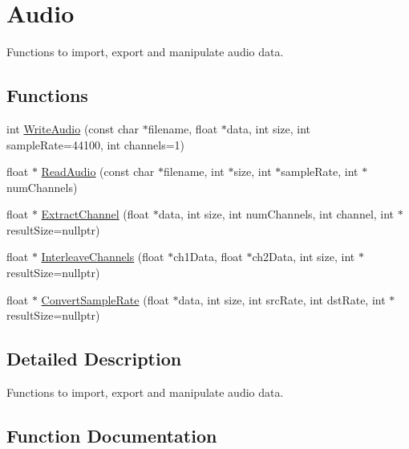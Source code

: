 \hypertarget{group__audio__group}{}\section{Audio}
\label{group__audio__group}


Functions to import, export and manipulate audio data.  


\subsection*{Functions}
\begin{DoxyCompactItemize}
\item 
int \hyperlink{group__audio__group_gaf55add952fe04c4b2758d18db17c8c91}{Write\+Audio} (const char $\ast$filename, float $\ast$data, int size, int sample\+Rate=44100, int channels=1)
\item 
float $\ast$ \hyperlink{group__audio__group_gac361b2470f0258861b9e34deffc8852a}{Read\+Audio} (const char $\ast$filename, int $\ast$size, int $\ast$sample\+Rate, int $\ast$num\+Channels)
\item 
float $\ast$ \hyperlink{group__audio__group_gabf6e39c7686cd89ddc45a0b6be943279}{Extract\+Channel} (float $\ast$data, int size, int num\+Channels, int channel, int $\ast$result\+Size=nullptr)
\item 
float $\ast$ \hyperlink{group__audio__group_ga701f2f439ffe751ed1a5f0b26d23e1c4}{Interleave\+Channels} (float $\ast$ch1\+Data, float $\ast$ch2\+Data, int size, int $\ast$result\+Size=nullptr)
\item 
float $\ast$ \hyperlink{group__audio__group_ga1f60f80cc1589adf04e9b253a5b872b8}{Convert\+Sample\+Rate} (float $\ast$data, int size, int src\+Rate, int dst\+Rate, int $\ast$result\+Size=nullptr)
\end{DoxyCompactItemize}


\subsection{Detailed Description}
Functions to import, export and manipulate audio data. 



\subsection{Function Documentation}
\mbox{\label{group__audio__group_ga1f60f80cc1589adf04e9b253a5b872b8}} 

